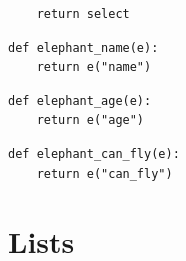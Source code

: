 \documentclass{exam}
\begin{document}
\begin{questions}
\begin{blocksection}
\begin{lstlisting}
    return select
\end{lstlisting}

\begin{lstlisting}
def elephant_name(e):
    return e("name")
\end{lstlisting}

\begin{lstlisting}
def elephant_age(e):
    return e("age")
\end{lstlisting}

\begin{lstlisting}
def elephant_can_fly(e):
    return e("can_fly")
\end{lstlisting}

\end{blocksection}
\end{questions}

\section{Lists}

\end{document}
